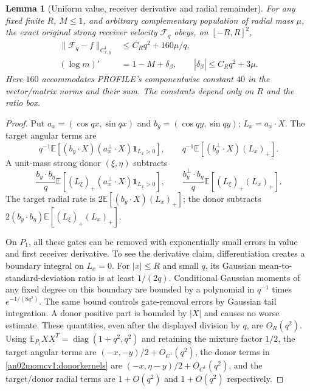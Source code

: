 \documentclass[11pt]{article}
\newtheorem{lemma}[theorem]{Lemma}
\theoremstyle{remark}\newtheorem{remark}[theorem]{Remark}
\newcommand{\E}{\mathbb E}
\newcommand{\one}{\mathbf1}
\begin{document}
\begin{lemma}[Uniform value, receiver derivative and radial remainder]
\label{an02momcv1:reduction}
For any fixed finite $R$, $M\le1$, and arbitrary complementary
population of radial mass $\mu$, the exact original strong receiver
velocity $\mathcal F_q$ obeys, on $[-R,R]^2$,
\begin{align}
 \|\mathcal F_q-f\|_{C^1_{x,y}}
 &\le C_Rq^2+160\mu/q, \label{an02momcv1:c1}\\
 (\log m)'&=1-M+\delta_\beta,\qquad
 |\delta_\beta|\le C_Rq^2+3\mu . \label{an02momcv1:radial}
\end{align}
Here $160$ accommodates PROFILE's componentwise constant $40$
in the vector/matrix norms and their sum. The constants
depend only on $R$ and the ratio box.
\end{lemma}
\begin{proof}
Put $a_x=(\cos qx,\sin qx)$ and $b_y=(\cos qy,\sin qy)$;
$L_x=a_x\cdot X$. The target angular terms are
\[
 q^{-1}\E[(b_y\cdot X)(a_x^\perp\cdot X)\one_{L_x>0}],
 \qquad q^{-1}\E[(b_y^\perp\cdot X)(L_x)_+].
\]
A unit-mass strong donor $(\xi,\eta)$ subtracts
\begin{equation}\label{an02momcv1:donorkernels}
 \frac{b_y\cdot b_\eta}{q}
   \E[(L_\xi)_+(a_x^\perp\cdot X)\one_{L_x>0}],
 \qquad
 \frac{b_y^\perp\cdot b_\eta}{q}
   \E[(L_\xi)_+(L_x)_+].
\end{equation}
The target radial rate is $2\E[(b_y\cdot X)(L_x)_+]$;
the donor subtracts
$2(b_y\cdot b_\eta)\E[(L_\xi)_+(L_x)_+]$.

On $P_1$, all these gates can be removed with exponentially small
errors in value and first receiver derivative. To see the derivative
claim, differentiation creates a boundary integral on $L_x=0$.
For $|x|\le R$ and small $q$, its Gaussian mean-to-standard-deviation
ratio is at least $1/(2q)$. Conditional Gaussian moments of any
fixed degree on this boundary are bounded by a polynomial in
$q^{-1}$ times $e^{-1/(8q^2)}$. The same bound controls gate-removal
errors by Gaussian tail integration. A donor positive part is
bounded by $|X|$ and causes no worse estimate. These quantities,
even after the displayed division by $q$, are $O_R(q^2)$.
Using $\E_{P_1}XX^T=\operatorname{diag}(1+q^2,q^2)$ and retaining
the mixture factor $1/2$, the target angular terms are
$(-x,-y)/2+O_{C^1}(q^2)$, the donor terms in
\eqref{an02momcv1:donorkernels} are
$(-x,\eta-y)/2+O_{C^1}(q^2)$, and the target/donor radial
terms are $1+O(q^2)$ and $1+O(q^2)$ respectively.


\end{proof}
\end{document}
